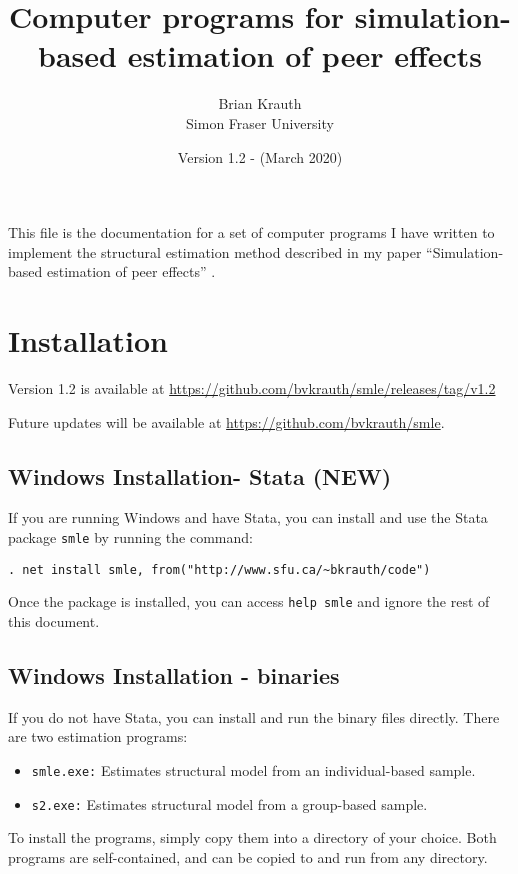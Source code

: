 \documentclass{article}
\begin{document}
\title{Computer programs for simulation-based estimation of peer effects}
\author{Brian Krauth \\
	Simon Fraser University}
\date{Version 1.2 - (March 2020)}
	
\maketitle

This file is the documentation for a set of computer programs
I have written to implement the structural estimation method
described in my paper ``Simulation-based estimation of peer effects'' \cite{smle}.

\section{Installation}

Version 1.2 is available at 
\url{https://github.com/bvkrauth/smle/releases/tag/v1.2}

Future updates will be available at \url{https://github.com/bvkrauth/smle}.

\subsection{Windows Installation- Stata (NEW)}

If you are running Windows and have Stata, you can install and 
use the Stata package {\tt smle} by running the command:
\begin{verbatim}
. net install smle, from("http://www.sfu.ca/~bkrauth/code")
\end{verbatim}
Once the package is installed, you can access {\tt help smle}
and ignore the rest of this document.

\subsection{Windows Installation - binaries}

If you do not have Stata, you can install and run the binary files directly. 
There are two estimation programs:
\begin{itemize}
	\item {\tt smle.exe:} Estimates structural model from an individual-based sample.
	\item {\tt s2.exe:} Estimates structural model from a group-based sample.
\end{itemize}
To install the programs, simply copy them into a directory of your choice.  
Both programs are self-contained, and can be copied to and run
from any directory.
\end{document}
